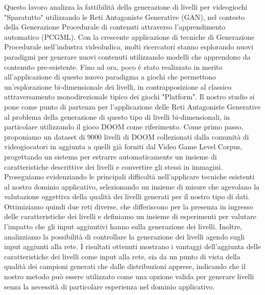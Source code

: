 Questo lavoro analizza la fattibilit\`a della generazione di livelli per videogiochi "Sparatutto" utilizzando le Reti Antagoniste Generative (GAN), nel contesto della Generazione Procedurale di contenuti attraverso l'apprendimento automatico (PCGML).
Con la crescente applicazione di tecniche di Generazione Procedurale nell'industra videoludica, molti ricercatori stanno esplorando nuovi paradigmi per generare nuovi contenuti utilizzando modelli che apprendono da contenuto pre-esistente. Fino ad ora, poco \`e stato realizzato in merito all'applicazione di questo nuovo paradigma a giochi che permettono un'esplorazione bi-dimensionale dei livelli, in contrapposizione al classico attraversamento monodirezionale tipico dei giochi "Platform". Il nostro studio si pone come punto di partenza per l'applicazione delle Reti Antagoniste Generative al problema della generazione di questo tipo di livelli bi-dimensionali, in particolare utilizzando il gioco DOOM come riferimento.
Come primo passo, proponiamo un dataset di 9000 livelli di DOOM collezionati dalla comunit\`a di videogiocatori in aggiunta a quelli gi\`a forniti dal Video Game Level Corpus, progettando un sistema per estrarre automaticamente un insieme di caratteristiche descrittive dei livelli e convertire gli stessi in immagini. Proseguiamo evidenziando le principali difficolt\`a nell'applicare tecniche esistenti al nostro dominio applicativo, selezionando un insieme di misure che agevolano la valutazione oggettiva della qualit\`a dei livelli generati per il nostro tipo di dati. Ottimiziamo quindi due reti diverse, che differiscono per la presenza in ingresso delle caratteristiche dei livelli e definiamo un insieme di esperimenti per valutare l'impatto che gli input aggiuntivi hanno sulla generazione dei livelli. Inoltre, analizziamo la possibilit\`a di controllare la generazione dei livelli agendo sugli input aggiunti alla rete. I risultati ottenuti mostrano i vantaggi dell'aggiunta delle caratteristiche dei livelli come input alla rete, sia da un punto di vista della qualit\`a dei campioni generati che dalle distribuzioni apprese, indicando che il nostro metodo pu\`o essere utilizzato come una opzione valida per generare livelli senza la necessit\`a di particolare esperienza nel dominio applicativo.
 






